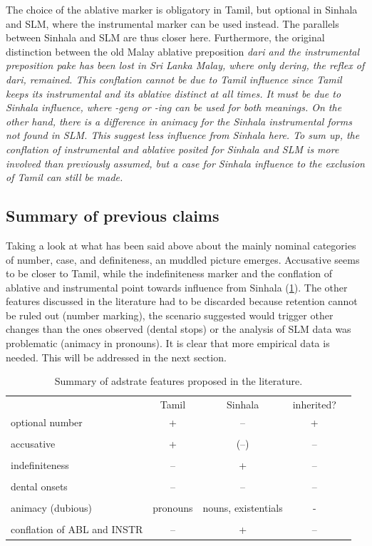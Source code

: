 \documentclass[a4paper,10pt]{article}
\begin{document}
The choice of the ablative marker is obligatory in Tamil, but optional in Sinhala and SLM, where the instrumental marker can be used instead. The parallels between Sinhala and SLM are thus closer here. Furthermore, the original distinction between the old Malay ablative preposition \em dari \em and the instrumental preposition \em pake \em has been lost in Sri Lanka Malay, where only \em dering\em, the reflex of \em dari\em, remained. This conflation cannot be due to Tamil influence since Tamil keeps its instrumental and its ablative distinct at all times. It must be due to Sinhala influence, where   \em -geng \em or \em -ing \em can be used for both meanings. On the other hand, there is a difference in animacy for the Sinhala instrumental forms  not found in SLM. This suggest less influence from Sinhala here. To sum up, the conflation of instrumental and ablative posited for Sinhala and SLM is more involved than previously assumed, but a case for Sinhala influence to the exclusion of Tamil can still be made.

\subsection{Summary of previous claims}
Taking a look at what has been said above about the mainly nominal categories of number, case, and definiteness, an muddled picture emerges. Accusative seems to be closer to Tamil, while the indefiniteness marker and the conflation of ablative and instrumental point towards influence from Sinhala (\ref{tab:summaryscreening}). The other features discussed in the literature had to be discarded because retention cannot be ruled out (number marking), the scenario suggested would trigger other changes than the ones observed (dental stops) or the analysis of SLM data was problematic (animacy in pronouns). It is clear that more empirical data is needed. This will be addressed in the next section.

\begin{table}
\begin{tabular}{p{2cm}cccc}
                & Tamil & Sinhala &   inherited?\\
optional number & +  & --   & +  \\ \\
accusative      & +  & (--) & --  \\ \\
indefiniteness  & -- & +    & --  \\ \\
dental onsets   & -- & --   & --  \\ \\
animacy (dubious)
                & pronouns & nouns, existentials& -  \\ \\
conflation of ABL and INSTR 
                & -- & +    & --  
\end{tabular}
\caption{Summary of adstrate features proposed in the literature.}
\label{tab:summaryscreening}
\end{table}
 
\end{document}
